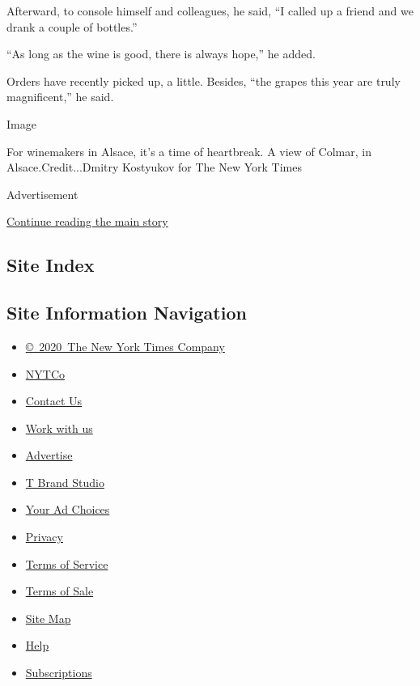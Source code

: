 Afterward, to console himself and colleagues, he said, ``I called up a
friend and we drank a couple of bottles.''

``As long as the wine is good, there is always hope,'' he added.

Orders have recently picked up, a little. Besides, ``the grapes this
year are truly magnificent,'' he said.

Image

For winemakers in Alsace, it's a time of heartbreak. A view of Colmar,
in Alsace.Credit...Dmitry Kostyukov for The New York Times

Advertisement

\protect\hyperlink{after-bottom}{Continue reading the main story}

\hypertarget{site-index}{%
\subsection{Site Index}\label{site-index}}

\hypertarget{site-information-navigation}{%
\subsection{Site Information
Navigation}\label{site-information-navigation}}

\begin{itemize}
\tightlist
\item
  \href{https://help.nytimes3xbfgragh.onion/hc/en-us/articles/115014792127-Copyright-notice}{©~2020~The
  New York Times Company}
\end{itemize}

\begin{itemize}
\tightlist
\item
  \href{https://www.nytco.com/}{NYTCo}
\item
  \href{https://help.nytimes3xbfgragh.onion/hc/en-us/articles/115015385887-Contact-Us}{Contact
  Us}
\item
  \href{https://www.nytco.com/careers/}{Work with us}
\item
  \href{https://nytmediakit.com/}{Advertise}
\item
  \href{http://www.tbrandstudio.com/}{T Brand Studio}
\item
  \href{https://www.nytimes3xbfgragh.onion/privacy/cookie-policy\#how-do-i-manage-trackers}{Your
  Ad Choices}
\item
  \href{https://www.nytimes3xbfgragh.onion/privacy}{Privacy}
\item
  \href{https://help.nytimes3xbfgragh.onion/hc/en-us/articles/115014893428-Terms-of-service}{Terms
  of Service}
\item
  \href{https://help.nytimes3xbfgragh.onion/hc/en-us/articles/115014893968-Terms-of-sale}{Terms
  of Sale}
\item
  \href{https://spiderbites.nytimes3xbfgragh.onion}{Site Map}
\item
  \href{https://help.nytimes3xbfgragh.onion/hc/en-us}{Help}
\item
  \href{https://www.nytimes3xbfgragh.onion/subscription?campaignId=37WXW}{Subscriptions}
\end{itemize}
